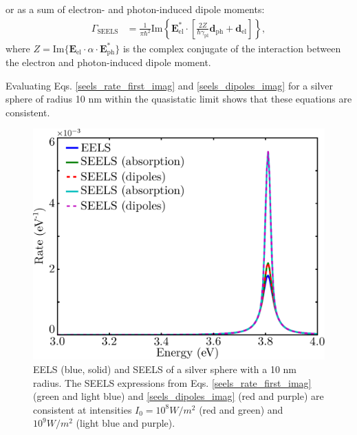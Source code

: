 \documentclass [11pt, proquest] {uwthesis}[2016/11/22]
\begin{document}
or as a sum of electron- and photon-induced dipole moments:
\begin{equation}
\begin{aligned}
\Gamma_{\textrm{SEELS}} &= \frac{1}{\pi\hbar^2}\textrm{Im}\left\{\textbf{E}_{\textrm{el}}^*\cdot\left[\frac{2Z}{\hbar\gamma_{\textrm{pl}}}\textbf{d}_{\textrm{ph}} + \textbf{d}_{\textrm{el}}\right]\right\},
  \label{seels_dipoles_imag}
\end{aligned}
\end{equation}
where $Z=\textrm{Im}\{\textbf{E}_{\textrm{el}}\cdot\alpha\cdot\textbf{E}_{\textrm{ph}}^*\}$ is the complex conjugate of the interaction between the electron and photon-induced dipole moment.

Evaluating Eqs. \ref{seels_rate_first_imag} and \ref{seels_dipoles_imag} for a silver sphere of radius 10 nm within the quasistatic limit shows that these equations are consistent.

\begin{figure}
\begin{centering}
\includegraphics[width=5.5in]{seels_for_defense.pdf}
\caption{EELS (blue, solid) and SEELS of a silver sphere with a 10 nm radius. The SEELS expressions from Eqs. \ref{seels_rate_first_imag} (green and light blue) and \ref{seels_dipoles_imag} (red and purple) are consistent at intensities $I_0 = 10^{8} W/m^2$ (red and green) and $10^9 W/m^2$ (light blue and purple).}
\label{seels_comparison}
\end{centering}
\end{figure}
\end{document}
